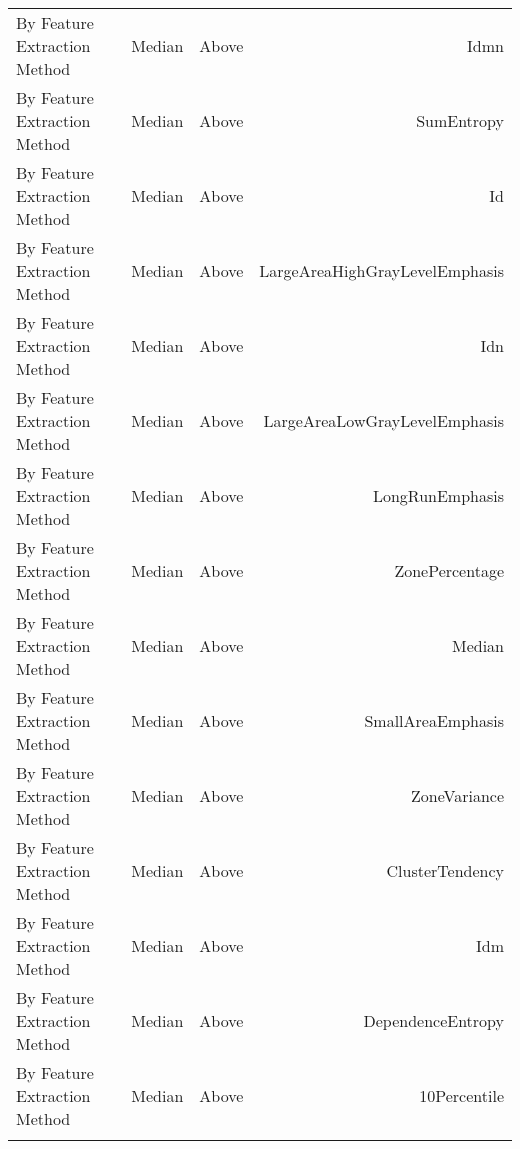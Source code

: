 {\begin{xltabular}{\textwidth}{X l l r}
By Feature Extraction Method & Median & Above & Idmn \\
By Feature Extraction Method & Median & Above & SumEntropy \\
By Feature Extraction Method & Median & Above & Id \\
By Feature Extraction Method & Median & Above & LargeAreaHighGrayLevelEmphasis \\
By Feature Extraction Method & Median & Above & Idn \\
By Feature Extraction Method & Median & Above & LargeAreaLowGrayLevelEmphasis \\
By Feature Extraction Method & Median & Above & LongRunEmphasis \\
By Feature Extraction Method & Median & Above & ZonePercentage \\
By Feature Extraction Method & Median & Above & Median \\
By Feature Extraction Method & Median & Above & SmallAreaEmphasis \\
By Feature Extraction Method & Median & Above & ZoneVariance \\
By Feature Extraction Method & Median & Above & ClusterTendency \\
By Feature Extraction Method & Median & Above & Idm \\
By Feature Extraction Method & Median & Above & DependenceEntropy \\
By Feature Extraction Method & Median & Above & 10Percentile \\
\vspace{10pt}
\end{xltabular}
}
